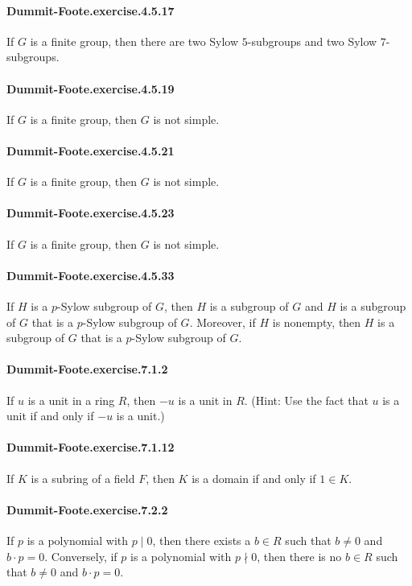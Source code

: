 \documentclass{article}
\begin{document}
\paragraph{Dummit-Foote.exercise.4.5.17} If $G$ is a finite group, then there are two Sylow $5$-subgroups and two Sylow $7$-subgroups.

\paragraph{Dummit-Foote.exercise.4.5.19} If $G$ is a finite group, then $G$ is not simple.

\paragraph{Dummit-Foote.exercise.4.5.21} If $G$ is a finite group, then $G$ is not simple.

\paragraph{Dummit-Foote.exercise.4.5.23} If $G$ is a finite group, then $G$ is not simple.

\paragraph{Dummit-Foote.exercise.4.5.33} If $H$ is a $p$-Sylow subgroup of $G$, then $H$ is a subgroup of $G$ and $H$ is a subgroup of $G$ that is a $p$-Sylow subgroup of $G$. Moreover, if $H$ is nonempty, then $H$ is a subgroup of $G$ that is a $p$-Sylow subgroup of $G$.

\paragraph{Dummit-Foote.exercise.7.1.2} If $u$ is a unit in a ring $R$, then $-u$ is a unit in $R$. (Hint: Use the fact that $u$ is a unit if and only if $-u$ is a unit.)

\paragraph{Dummit-Foote.exercise.7.1.12} If $K$ is a subring of a field $F$, then $K$ is a domain if and only if $1 \in K$.

\paragraph{Dummit-Foote.exercise.7.2.2} If $p$ is a polynomial with $p \mid 0$, then there exists a $b \in R$ such that $b \neq 0$ and $b \cdot p = 0$. Conversely, if $p$ is a polynomial with $p \nmid 0$, then there is no $b \in R$ such that $b \neq 0$ and $b \cdot p = 0$.
\end{document}
